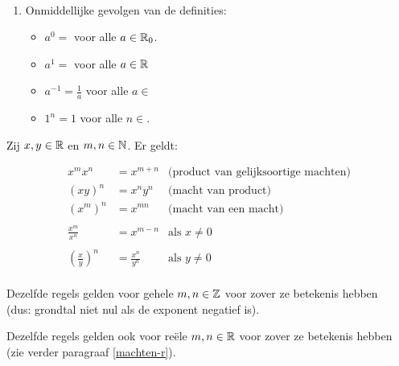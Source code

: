 \documentclass{ximera}
\begin{document}
\begin{remark} \ 
	
	\begin{enumerate}
	\item Onmiddellijke gevolgen van de definities:
			\begin{itemize}
			\item $a^0=$ voor alle $a\in\mathbb{R}_0$.
			\item $a^1=$ voor alle $a\in\mathbb{R}$
			\item $a^{-1}=\frac{1}{a}$ voor alle $a\in$\wordChoice{\choice{$\R$}\choice{$\Rplus$}\choice[correct]{$\Rnul$}}
			\item $1^n=1$ voor alle $n\in$\wordChoice{\choice{$\N$}\choice{$\R$}\choice[correct]{$\Z$}}.
		\end{itemize}
\end{enumerate} 
\end{remark}

\begin{proposition} \label{eig:rekenregels machten}
	Zij $x,y\in\mathbb{R}$ en $m,n\in\mathbb{N}$. Er geldt:
{
	\savebox\strutbox{$\vphantom{\dfrac11^n}$}   %
\begin{align*}
	x^{m}x^{n}  & = x^{m+n}            & \text{(product van gelijksoortige machten)} \\
	(xy)^n      & = x^ny^n             & \text{(macht van product)}\\
	\left(x^{m}\right)^{n} & = x^{mn}  & \text{(macht van een macht)} \\
	\\
	\frac{x^{m}}{x^{n}}    & = x^{m-n} & \text{als }x\neq0\\
	\\
	\left(\frac{x}{y}\right)^{n} & = \frac{x^{n}}{y^{n}} & \text{als }y\neq0\\
\end{align*}

	Dezelfde regels gelden voor gehele $m,n\in\mathbb{Z}$ voor zover ze betekenis hebben 
	\\ (dus: grondtal niet nul als de exponent negatief is).
	
	Dezelfde regels gelden ook voor reële $m,n\in\mathbb{R}$ voor zover ze betekenis hebben
	\\ (zie verder paragraaf \ref{machten-r}).
}
\end{proposition}
\end{document}
